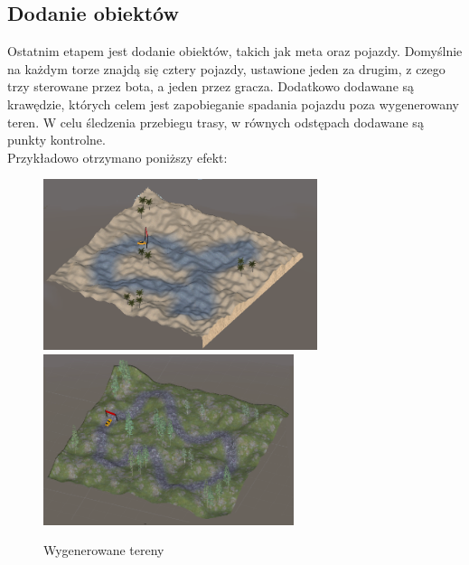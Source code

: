 \subsection{Dodanie obiektów}
Ostatnim etapem jest dodanie obiektów, takich jak meta oraz pojazdy. Domyślnie na każdym torze znajdą się cztery pojazdy, ustawione jeden za drugim, z czego trzy sterowane przez bota, a jeden przez gracza. Dodatkowo dodawane są krawędzie, których celem jest zapobieganie spadania pojazdu poza wygenerowany teren. W celu śledzenia przebiegu trasy, w równych odstępach dodawane są punkty kontrolne.\\
Przykładowo otrzymano poniższy efekt:
\begin{figure}[h]
        \centering
        \includegraphics[height=5cm]{figures/terrains_2.png}
    \endminipage\hfill
        \centering
        \includegraphics[height=5cm]{figures/terrains_1.png}
    \endminipage
    \caption{Wygenerowane tereny}
    \label{table}
\end{figure}
\clearpage